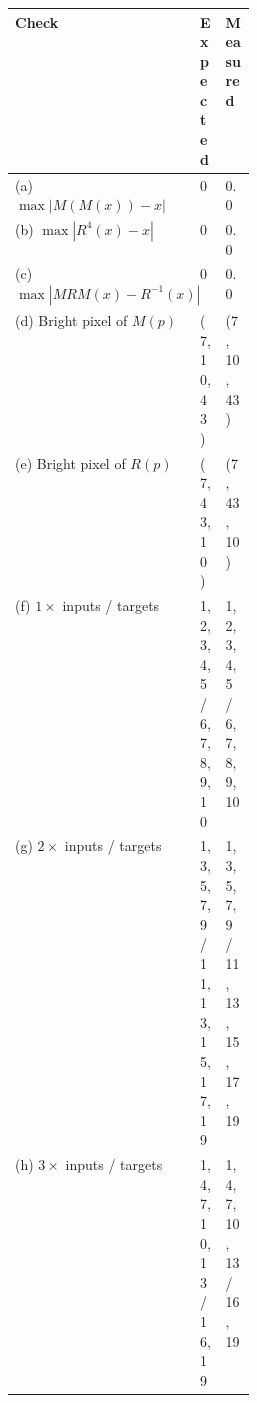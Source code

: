 \par\begingroup\centering\small\setlength{\parskip}{0pt}\setlength{\tabcolsep}{4pt}
\begin{tabularx}{\linewidth}{@{}p{0.28\linewidth}XX@{}}
\toprule Check & Expected & Measured \\\midrule
(a) $\max|M(M(x))-x|$ & 0 & 0.0 \\
(b) $\max|R^4(x)-x|$ & 0 & 0.0 \\
(c) $\max|MRM(x)-R^{-1}(x)|$ & 0 & 0.0 \\
(d) Bright pixel of $M(p)$ & (7, 10, 43) & (7, 10, 43) \\
(e) Bright pixel of $R(p)$ & (7, 43, 10) & (7, 43, 10) \\
(f) $1\times$ inputs / targets & 1, 2, 3, 4, 5 / 6, 7, 8, 9, 10 & 1, 2, 3, 4, 5 / 6, 7, 8, 9, 10 \\
(g) $2\times$ inputs / targets & 1, 3, 5, 7, 9 / 11, 13, 15, 17, 19 & 1, 3, 5, 7, 9 / 11, 13, 15, 17, 19 \\
(h) $3\times$ inputs / targets & 1, 4, 7, 10, 13 / 16, 19 & 1, 4, 7, 10, 13 / 16, 19 \\
\bottomrule\end{tabularx}\par\endgroup\vspace{4pt}
